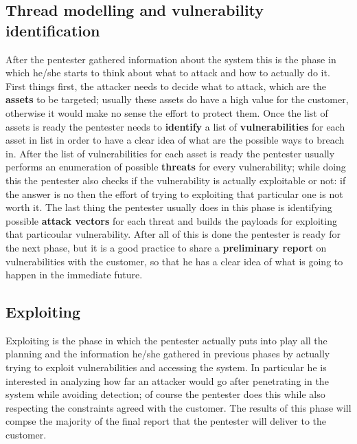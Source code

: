 \subsection{Thread modelling and vulnerability identification}
After the pentester gathered information about the system this is the phase in which he/she starts to think about what to attack and how to actually do it.
First things first, the attacker needs to decide what to attack, which are the \textbf{assets} to be targeted; usually these assets do have a high value for the customer, otherwise it would make no sense the effort to protect them.
\newline
Once the list of assets is ready the pentester needs to \textbf{identify} a list of \textbf{vulnerabilities} for each asset in list in order to have a clear idea of what are the possible ways to breach in.
\newline
After the list of vulnerabilities for each asset is ready the pentester usually performs an enumeration of possible \textbf{threats} for every vulnerability; while doing this the pentester also checks if the vulnerability is actually exploitable or not: if the answer is no then the effort of trying to exploiting that particular one is not worth it.
\newline
The last thing the pentester usually does in this phase is identifying possible \textbf{attack vectors} for each threat and builds the payloads for exploiting that particoular vulnerability.
\newline
After all of this is done the pentester is ready for the next phase, but it is a good practice to share a \textbf{preliminary report} on vulnerabilities with the customer, so that he has a clear idea of what is going to happen in the immediate future.

\subsection{Exploiting}
Exploiting is the phase in which the pentester actually puts into play all the planning and the information he/she gathered in previous phases by actually trying to exploit vulnerabilities and accessing the system. In particular he is interested in analyzing how far an attacker would go after penetrating in the system while avoiding detection; of course the pentester does this while also respecting the constraints agreed with the customer.
\newline
The results of this phase will compse the majority of the final report that the pentester will deliver to the customer.

